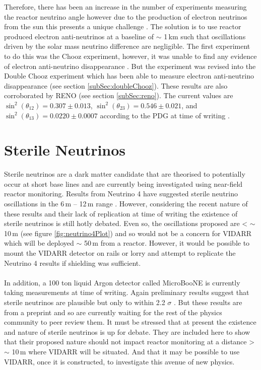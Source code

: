 Therefore, there has been an increase in the number of experiments measuring the reactor neutrino angle however due to the production of electron neutrinos from the sun this presents a unique challenge \cite{Olive_2014}. The solution is to use reactor produced electron anti-neutrinos at a baseline of $\sim$ 1\,km such that oscillations driven by the solar mass neutrino difference are negligible. The first experiment to do this was the Chooz experiment, however, it was unable to find any evidence of electron anti-neutrino disappearance \cite{Olive_2014}. But the experiment was revised into the Double Chooz experiment which has been able to measure electron anti-neutrino disappearance (see section  \ref{subSec:doubleChooz}). These results are also corroborated by RENO (see section \ref{subSec:reno}). The current values are $\sin^2(\theta_{12}) = 0.307 \pm 0.013$, $\sin^2(\theta_{23}) = 0.546 \pm 0.021$, and $\sin^2(\theta_{13}) = 0.0220 \pm 0.0007$ according to the PDG at time of writing \cite{Zyla_pdg_2020}.


\section{Sterile Neutrinos}
Sterile neutrinos are a dark matter candidate that are theorised to potentially occur at short base lines and are currently being investigated using near-field reactor monitoring. Results from Neutrino 4 have suggested sterile neutrino oscillations in the 6\,m -- 12\,m range \cite{neutrino4_2021}. However, considering the recent nature of these results and their lack of replication at time of writing the existence of sterile neutrinos is still hotly debated. Even so, the oscillations proposed are < $\sim$ 10\,m \cite{neutrino4_2021} (see figure \ref{fig:neutrino4Plot}) and so would not be a concern for  VIDARR which will be deployed $\sim$ 50\,m from a reactor. However, it would be possible to mount the VIDARR detector on rails or lorry and attempt to replicate the Neutrino 4 results if shielding was sufficient. 
\\\\In addition, a 100 ton liquid Argon detector called MicroBooNE \cite{Karagiorgi_2012} is currently taking measurements at time of writing. Again preliminary results suggest that sterile neutrinos are plausible but only to within 2.2 $\sigma$ \cite{denton2021sterile}. But these results are from a preprint and so are currently waiting for the rest of the physics community to peer review them. It must be stressed that at present the existence and nature of sterile neutrinos is up for debate. They are included here to show that their proposed nature should not impact reactor monitoring at a distance > $\sim$ 10\,m  where VIDARR will be situated. And that it may be possible to use VIDARR, once it is constructed, to investigate this avenue of new physics.


